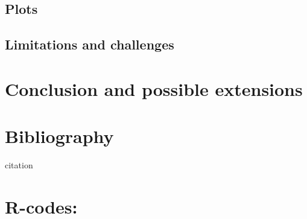 \documentclass{article}\usepackage[]{graphicx}\usepackage[]{color}
\begin{document}
\subsection{Plots}



\subsection{Limitations and challenges}




\section{Conclusion and possible extensions}




\section{Bibliography}
 \begin{thebibliography}{99}

\item citation

\end{thebibliography}

\section{R-codes:}




\end{document}
